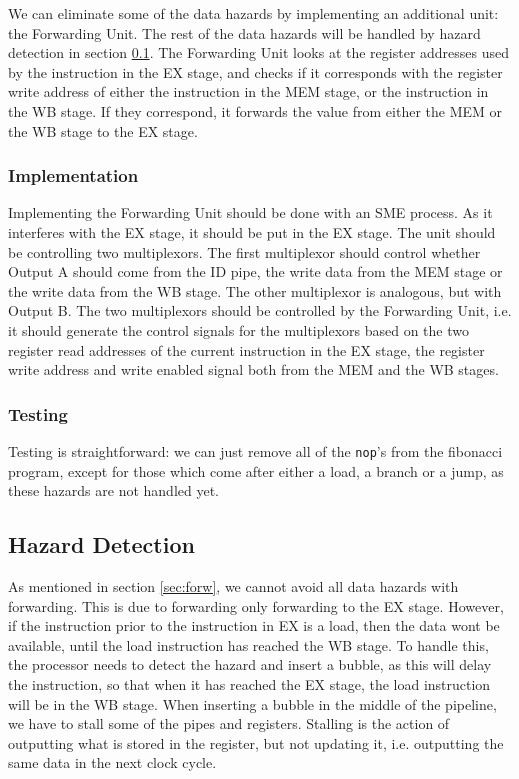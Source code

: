 We can eliminate some of the data hazards by implementing an additional unit:
the Forwarding Unit. The rest of the data hazards will be handled by hazard
detection in section \ref{sec:haz}. The Forwarding Unit looks at the register
addresses used by the instruction in the EX stage, and checks if it corresponds
with the register write address of either the instruction in the MEM stage, or
the instruction in the WB stage. If they correspond, it forwards the value from
either the MEM or the WB stage to the EX stage.

\subsubsection*{Implementation}
Implementing the Forwarding Unit should be done with an SME process. As it
interferes with the EX stage, it should be put in the EX stage. The unit should
be controlling two multiplexors. The first multiplexor should control whether
Output A should come from the ID pipe, the write data from the MEM stage or the
write data from the WB stage. The other multiplexor is analogous, but with
Output B. The two multiplexors should be controlled by the Forwarding Unit,
i.e. it should generate the control signals for the multiplexors based on the
two register read addresses of the current instruction in the EX stage, the
register write address and write enabled signal both from the MEM and the WB
stages.

\subsubsection*{Testing}
Testing is straightforward: we can just remove all of the \texttt{nop}'s from
the fibonacci program, except for those which come after either a load, a
branch or a jump, as these hazards are not handled yet.

\subsection{Hazard Detection}\label{sec:haz}
As mentioned in section \ref{sec:forw}, we cannot avoid all data hazards with
forwarding. This is due to forwarding only forwarding to the EX stage. However,
if the instruction prior to the instruction in EX is a load, then the data wont
be available, until the load instruction has reached the WB stage. To handle
this, the processor needs to detect the hazard and insert a bubble, as this
will delay the instruction, so that when it has reached the EX stage, the load
instruction will be in the WB stage. When inserting a bubble in the middle of
the pipeline, we have to stall some of the pipes and registers. Stalling is the
action of outputting what is stored in the register, but not updating it, i.e.
outputting the same data in the next clock cycle.

